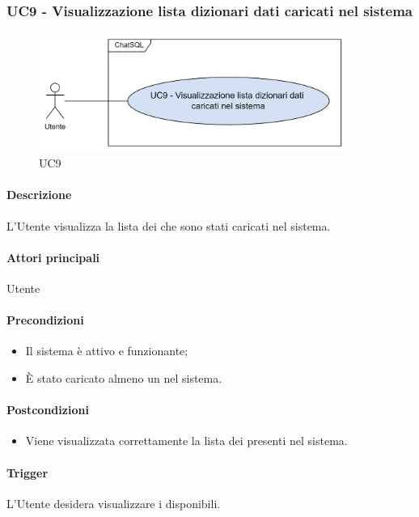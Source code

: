 \subsubsection{UC9 - Visualizzazione lista dizionari dati caricati nel sistema}\label{UC9}

\begin{figure}[H]
  \centering
  \includegraphics[width=0.90\textwidth]{assets/uc9.png}
  \caption{UC9}
\end{figure}

\paragraph*{Descrizione}
L'Utente visualizza la lista dei  che sono stati caricati nel sistema.

\paragraph*{Attori principali}
Utente

\paragraph*{Precondizioni}
\begin{itemize}
  \item Il sistema è attivo e funzionante;
  \item È stato caricato almeno un  nel sistema.  
\end{itemize}

\paragraph*{Postcondizioni}
\begin{itemize}
\item Viene visualizzata correttamente la lista dei  presenti nel sistema.
\end{itemize}

\paragraph*{Trigger}
L'Utente desidera visualizzare i  disponibili.

